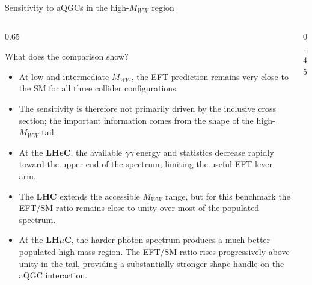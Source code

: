 \documentclass[aspectratio=1610,english]{beamer}
\begin{document}
\begin{frame}{Sensitivity to aQGCs in the high-$M_{WW}$ region}
	
	
\begin{columns}%


		
\begin{column}{0.65\textwidth} 
			
\begin{block}{What does the comparison show?} 

\begin{itemize} 

\tiny\justifying 

\item At low and intermediate $M_{WW}$, the EFT prediction remains
very close to the SM for all three collider configurations. 

\item The sensitivity is therefore not primarily driven by the
inclusive cross section; the important information comes 
from the shape of the high-$M_{WW}$ tail. 

\item At the \textbf{\color{blue} LHeC}, the available $\gamma\gamma$ energy and
statistics decrease rapidly toward the upper end of the spectrum,
limiting the useful EFT lever arm. 

\item The \textbf{\color{black} LHC} extends the accessible $M_{WW}$ range, but for
this benchmark the EFT/SM ratio remains close to unity over most of
the populated spectrum. 

\item At the \textbf{\color{red} LH$\mu$C}, the harder photon spectrum produces
a much better populated high-mass region. The EFT/SM ratio rises
progressively above unity in the tail, providing a substantially
stronger shape handle on the aQGC interaction. 

\end{itemize} 

\end{block} 

\end{column} 


\begin{column}{0.45\textwidth} 
	

\end{column}
\end{columns}
\end{frame}
\end{document}
